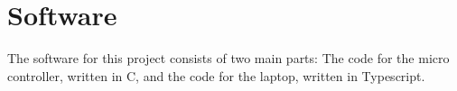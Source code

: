 \section{Software}
\label{sec:software}

The software for this project consists of two main parts: The code for the micro controller, written in C, and the code for the laptop, written in Typescript.